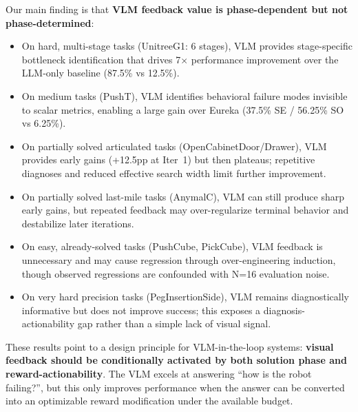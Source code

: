 \documentclass[conference]{IEEEtran}
\begin{document}
Our main finding is that \textbf{VLM feedback value is phase-dependent but not
phase-determined}:
\begin{itemize}
  \item On hard, multi-stage tasks (UnitreeG1: 6 stages), VLM provides
    stage-specific bottleneck identification that drives 7$\times$ performance
    improvement over the LLM-only baseline (87.5\% vs 12.5\%).
  \item On medium tasks (PushT), VLM identifies behavioral failure modes
    invisible to scalar metrics, enabling a large gain over Eureka
    (37.5\% SE / 56.25\% SO vs 6.25\%).
  \item On partially solved articulated tasks (OpenCabinetDoor/Drawer), VLM
    provides early gains (+12.5pp at Iter~1) but then plateaus; repetitive
    diagnoses and reduced effective search width limit further improvement.
  \item On partially solved last-mile tasks (AnymalC), VLM can still produce
    sharp early gains, but repeated feedback may over-regularize terminal
    behavior and destabilize later iterations.
  \item On easy, already-solved tasks (PushCube, PickCube), VLM feedback is
    unnecessary and may cause regression through over-engineering induction,
    though observed regressions are confounded with N=16 evaluation noise.
  \item On very hard precision tasks (PegInsertionSide), VLM remains
    diagnostically informative but does not improve success; this exposes a
    diagnosis-actionability gap rather than a simple lack of visual signal.
\end{itemize}

These results point to a design principle for VLM-in-the-loop systems:
\textbf{visual feedback should be conditionally activated by both solution
phase and reward-actionability}. The VLM excels at answering ``how is the robot
failing?'', but this only improves performance when the answer can be converted
into an optimizable reward modification under the available budget.





\end{document}
